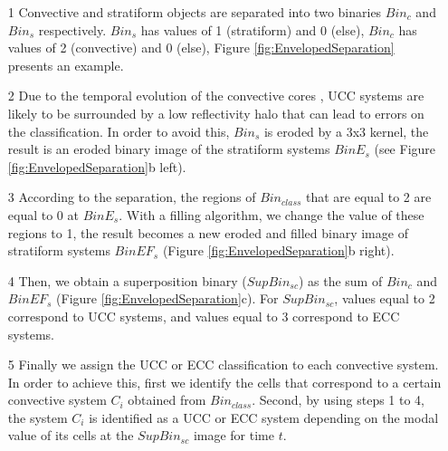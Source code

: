 \documentclass[preprint,12pt]{elsarticle}
\begin{document}
\begin{itemize}
    \item[1] Convective and stratiform objects are separated into two binaries $Bin_c$ and $Bin_s$ respectively.  $Bin_s$ has values of 1 (stratiform) and 0 (else), $Bin_c$ has values of 2 (convective) and 0 (else), Figure \ref{fig:EnvelopedSeparation} presents an example.

    \item[2] Due to the temporal evolution of the convective cores \citep{Hilgendorf1998,HouzeJr2004,Futyan2007}, UCC systems are likely to be surrounded by a low reflectivity halo that can lead to errors on the classification.  In order to avoid this, $Bin_s$ is eroded by a 3x3 kernel, the result is an eroded binary image of the stratiform systems $BinE_s$ (see Figure \ref{fig:EnvelopedSeparation}b left).  

    \item[3] According to the separation, the regions of $Bin_{class}$ that are equal to 2 are equal to 0 at $BinE_{s}$.  With a filling algorithm, we change the value of these regions to 1, the result becomes a new eroded and filled binary image of stratiform systems $BinEF_s$ (Figure \ref{fig:EnvelopedSeparation}b right).

    \item[4] Then, we obtain a superposition binary ($SupBin_{sc}$) as the sum of $Bin_c$ and $BinEF_s$ (Figure \ref{fig:EnvelopedSeparation}c). For $SupBin_{sc}$, values equal to 2 correspond to UCC systems, and values equal to 3 correspond to ECC systems.

    \item[5] Finally we assign the UCC or ECC classification to each convective system. In order to achieve this, first we identify the cells that correspond to a certain convective system $C_i$ obtained from $Bin_{class}$.  Second, by using steps 1 to 4, the system $C_i$ is identified as a UCC or ECC system depending on the modal value of its cells at the $SupBin_{sc}$ image for time $t$. 
\end{itemize}
\end{document}
